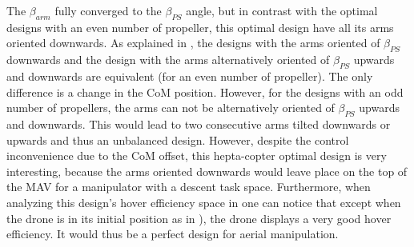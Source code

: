 The $\beta_{arm}$ fully converged to the $\beta_{PS}$ angle, but in contrast with the
optimal designs with an even number of propeller, this optimal design have all its arms
oriented downwards. As explained in , the designs with the arms
oriented of $\beta_{PS}$ downwards and the design with the arms alternatively oriented
of $\beta_{PS}$ upwards and downwards are equivalent (for an even number of propeller).
The only difference is a change in the CoM position. However, for the designs with an odd
number of propellers, the arms can not be alternatively oriented of $\beta_{PS}$ upwards
and downwards. This would lead to two consecutive arms tilted downwards or upwards
and thus an unbalanced design. However, despite the control inconvenience due to the
CoM offset, this hepta-copter optimal design is very interesting, because the arms
oriented downwards would leave place on the top of the MAV for a manipulator with
a descent task space. Furthermore, when analyzing this design’s hover efficiency space
in  one can notice that except when the drone is in its initial
position as in ), the drone displays a very good hover efficiency.
It would thus be a perfect design for aerial manipulation.

